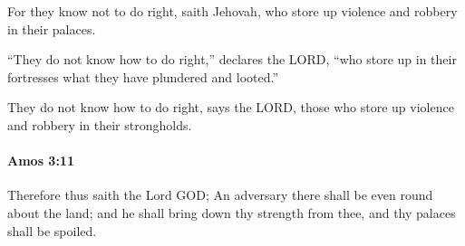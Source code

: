 			\begin{versebox}
					\item[BHS] 
					\item[LXX] 
					\item[ASV] For they know not to do right, saith Jehovah, who store up violence and robbery in their palaces.
					\item[NIV] “They do not know how to do right,” declares the LORD, “who store up in their fortresses what they have plundered and looted.”
					\item[NRSV] They do not know how to do right, says the LORD, those who store up violence and robbery in their strongholds.
			\end{versebox}

		\paragraph{Amos 3:11} %
			\label{AMOS-3-11}

			Therefore thus saith the Lord GOD; An adversary there shall be even round about the land; and he shall bring down thy strength from thee, and thy palaces shall be spoiled.


